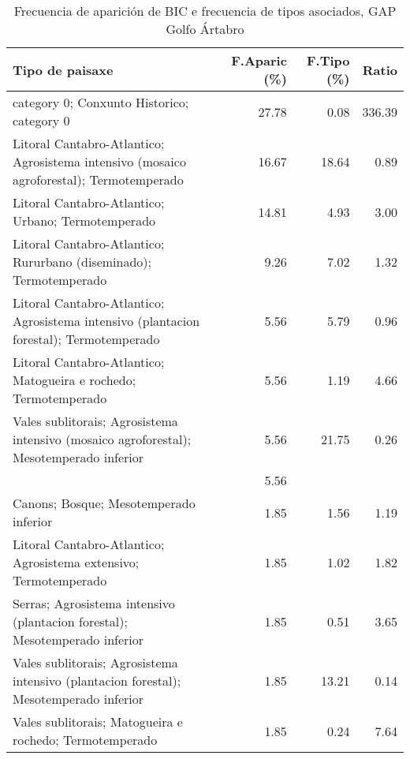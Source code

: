 \begin{table}[p]
\centering
\caption{Frecuencia de aparición de BIC e frecuencia de tipos asociados, GAP Golfo Ártabro} 
\label{vbic1}
\begin{tabular}{lrrr}
  \hline
Tipo de paisaxe & F.Aparic (\%) & F.Tipo (\%) & Ratio \\ 
  \hline
category 0; Conxunto Historico; category 0 & 27.78 & 0.08 & 336.39 \\ 
  Litoral Cantabro-Atlantico; Agrosistema intensivo (mosaico agroforestal); Termotemperado & 16.67 & 18.64 & 0.89 \\ 
  Litoral Cantabro-Atlantico; Urbano; Termotemperado & 14.81 & 4.93 & 3.00 \\ 
  Litoral Cantabro-Atlantico; Rururbano (diseminado); Termotemperado & 9.26 & 7.02 & 1.32 \\ 
  Litoral Cantabro-Atlantico; Agrosistema intensivo (plantacion forestal); Termotemperado & 5.56 & 5.79 & 0.96 \\ 
  Litoral Cantabro-Atlantico; Matogueira e rochedo; Termotemperado & 5.56 & 1.19 & 4.66 \\ 
  Vales sublitorais; Agrosistema intensivo (mosaico agroforestal); Mesotemperado inferior & 5.56 & 21.75 & 0.26 \\ 
   & 5.56 &  &  \\ 
  Canons; Bosque; Mesotemperado inferior & 1.85 & 1.56 & 1.19 \\ 
  Litoral Cantabro-Atlantico; Agrosistema extensivo; Termotemperado & 1.85 & 1.02 & 1.82 \\ 
  Serras; Agrosistema intensivo (plantacion forestal); Mesotemperado inferior & 1.85 & 0.51 & 3.65 \\ 
  Vales sublitorais; Agrosistema intensivo (plantacion forestal); Mesotemperado inferior & 1.85 & 13.21 & 0.14 \\ 
  Vales sublitorais; Matogueira e rochedo; Termotemperado & 1.85 & 0.24 & 7.64 \\ 
   \hline
\end{tabular}
\end{table}
